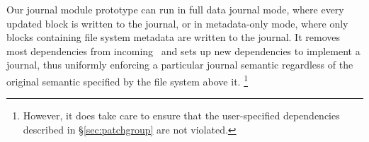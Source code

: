 \begin{comment}
Our journal module prototype ignores incoming dependencies
and enforces transactions based on high-level file system operations.
%
It thus uniformly enforces a particular journal semantic---namely, that
each file system operation happens atomically---regardless of the semantics
specified by the file system above it.
%
It should be possible, however, to extend the journal module to obey
dependencies.
\end{comment}


Our journal module prototype can run in full data journal mode, where every
updated block is written to the journal, or in metadata-only mode, where only
blocks containing file system metadata are written to the journal. It removes
most dependencies from incoming \patches\ and sets up new dependencies to
implement a journal, thus uniformly enforcing a particular journal semantic
regardless of the original semantic specified by the file system above it.
\footnote{However, it does take care to ensure that the user-specified
dependencies described in \S\ref{sec:patchgroup} are not violated.}
